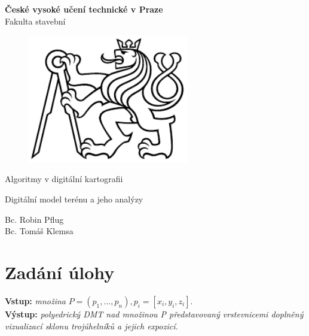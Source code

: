 \documentclass[a4paper, 12pt]{article}
\begin{document}
\begin{titlepage}
\begin{center}
\noindent
\Large \textbf{České vysoké učení technické v Praze }\\ Fakulta stavební
\vspace{5cm}

\huge

\begin{figure}[h!]
	\centering
	\includegraphics[width=7cm]{logo.png}
\end{figure}

\vspace{0.5cm}

Algoritmy v digitální kartografii \\

\vspace{3cm}

\Huge  
Digitální model terénu a jeho analýzy\\

\vspace{2cm}

\Large
Bc. Robin Pflug \\
Bc. Tomáš Klemsa \\

\end{center}

\end{titlepage}




\pagestyle{plain}     %
\setcounter{page}{1}  %

\tableofcontents
\newpage

\section{Zadání úlohy}

\textbf{Vstup:} \textit{množina} $P=(p_1,...,p_n),p_i=[x_i,y_i,z_i]$.\\
\textbf{Výstup:} 	\textit{polyedrický DMT nad množinou P představovaný vrstevnicemi doplněný vizualizací sklonu trojúhelníků a jejich expozicí.}\\
\end{document}
